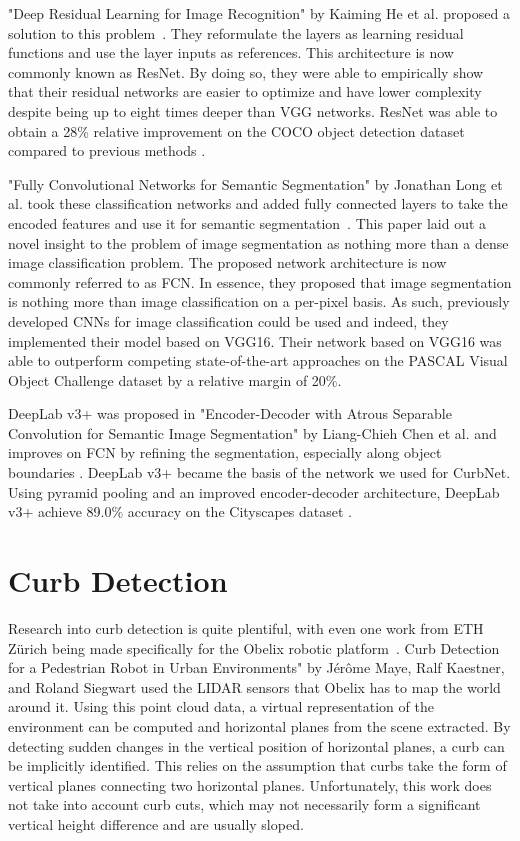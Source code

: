 "Deep Residual Learning for Image Recognition" by Kaiming He et al. proposed a solution to this problem~\cite{resnet}.
They reformulate the layers as learning residual functions and use the layer inputs as references.
This architecture is now commonly known as ResNet.
By doing so, they were able to empirically show that their residual networks are easier to optimize and have lower complexity despite being up to eight times deeper than VGG networks.
ResNet was able to obtain a 28\% relative improvement on the COCO object detection dataset compared to previous methods \cite{coco}.

"Fully Convolutional Networks for Semantic Segmentation" by Jonathan Long et al. took these classification networks and added fully connected layers to take the encoded features and use it for semantic segmentation~\cite{fcn}.
This paper laid out a novel insight to the problem of image segmentation as nothing more than a dense image classification problem.
The proposed network architecture is now commonly referred to as FCN.
In essence, they proposed that image segmentation is nothing more than image classification on a per-pixel basis.
As such, previously developed CNNs for image classification could be used and indeed, they implemented their model based on VGG16.
Their network based on VGG16 was able to outperform competing state-of-the-art approaches on the PASCAL Visual Object Challenge dataset by a relative margin of 20\%.

DeepLab v3+ was proposed in "Encoder-Decoder with Atrous Separable Convolution for Semantic Image Segmentation" by Liang-Chieh Chen et al. and improves on FCN by refining the segmentation, especially along object boundaries \cite{deeplab}.
DeepLab v3+ became the basis of the network we used for CurbNet.
Using pyramid pooling and an improved encoder-decoder architecture, DeepLab v3+ achieve 89.0\% accuracy on the Cityscapes dataset \cite{cityscapes}.

\section{Curb Detection}\label{section:relatedwork-curbdetection}
Research into curb detection is quite plentiful, with even one work from ETH Zürich being made specifically for the Obelix robotic platform~\cite{ethobelix}.
Curb Detection for a Pedestrian Robot in Urban Environments" by Jérôme Maye, Ralf Kaestner, and Roland Siegwart used the LIDAR sensors that Obelix has to map the world around it.
Using this point cloud data, a virtual representation of the environment can be computed and horizontal planes from the scene extracted.
By detecting sudden changes in the vertical position of horizontal planes, a curb can be implicitly identified.
This relies on the assumption that curbs take the form of vertical planes connecting two horizontal planes.
Unfortunately, this work does not take into account curb cuts, which may not necessarily form a significant vertical height difference and are usually sloped.

